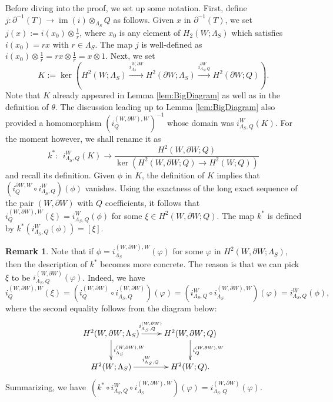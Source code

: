 \documentclass[11pt,a4paper]{amsart}
\theoremstyle{definition}
\newtheorem{remark}[theorem]{Remark}
\newcommand{\im}{\operatorname{im}}
\begin{document}
Before diving into the proof, we set up some notation. First, define $j \colon \partial^{-1}(T) \to \im(i)\otimes_{\Lambda_S} Q$ as follows. 
Given $x$ in $\partial^{-1}(T)$, we set $j(x):=i(x_0) \otimes \frac{1}{r}$, where $x_0$ is any element of $H_2(W;\Lambda_S)$ which satisfies $i(x_0)=r x$ with $r \in \Lambda_S$. 
The map $j$ is well-defined as $i(x_0) \otimes \frac{1}{r}=rx \otimes \frac{1}{r}=x \otimes 1$.
Next, we set 
$$K:=\ker (H^2(W;\Lambda_S) \stackrel{i^{W,\partial W}_{\Lambda_S}}{\longrightarrow} H^2(\partial W;\Lambda_S) \stackrel{i^{\partial W}_{\Lambda_S,Q}}{\longrightarrow} H^2(\partial W;Q)).$$ 
Note that $K$ already appeared in Lemma \ref{lem:BigDiagram} as well as in the definition of $\theta$. The discussion leading up to Lemma \ref{lem:BigDiagram} also provided a homomorphism $(i_Q^{(W,\partial W),W})^{-1}$ whose domain was $i^W_{\Lambda_S,Q}(K)$. 
For the moment however, we shall rename it as 
$$k^* \colon \ \ i^W_{\Lambda_S,Q}(K) \to \frac{H^2(W,\partial W;Q)}{\ker(H^2(W,\partial W ;Q) \to H^2(W;Q))} $$
and recall its definition. Given $\phi$ in $K$, the definition of $K$ implies that $(i_Q^{\partial W, W} \circ i^W_{\Lambda_S,Q})(\phi)$ vanishes. Using the exactness of the long exact sequence of the pair $(W,\partial W)$ with $Q$ coefficients, it follows that $i_{Q}^{(W,\partial W),W}(\xi)=i^W_{\Lambda_S,Q}(\phi)$ for some $\xi \in H^2(W,\partial W;Q)$. The map $k^*$ is defined by $k^* (i^W_{\Lambda_S,Q} (\phi))=[\xi]$.

\begin{remark}
\label{rem:ExampleOfMapk}
Note that if $\phi= i_{\Lambda_S}^{(W,\partial W),W}( \varphi)$ for some $\varphi$ in $H^2(W,\partial W;\Lambda_S)$, then the description of $k^*$ becomes more concrete. The reason is that we can pick $\xi$ to be $ i_{\Lambda_S,Q}^{(W,\partial W)}(\varphi)$. Indeed, we have 
$$i_{Q}^{(W,\partial W),W}(\xi)
=(i_{Q}^{(W,\partial W)} \circ i_{\Lambda_S,Q}^{(W,\partial W)})(\varphi)
= ( i^W_{\Lambda_S,Q} \circ i_{\Lambda_S}^{(W,\partial W),W})( \varphi) 
=i^W_{\Lambda_S,Q}(\phi),$$
where the second equality follows from the diagram below:
\begin{equation}
\label{eq:ExampleOfMapk}
\xymatrix{
H^2(W,\partial W;\Lambda_S) \ar[r]^{i_{\Lambda_S,Q}^{(W,\partial W)}} \ar[d]^{i_{\Lambda_S}^{(W,\partial W),W}}
& H^2(W,\partial W;Q) \ar[d]^{i_Q^{(W,\partial W),W}}\\
H^2(W;\Lambda_S) \ar[r]^{i_{\Lambda_S,Q}^{W}} 
 & H^2(W;Q).
}
\end{equation}
Summarizing, we have~$(k^* \circ i^W_{\Lambda_S,Q} \circ i_{\Lambda_S}^{(W,\partial W),W})(\varphi)= i_{\Lambda_S,Q}^{(W,\partial W)}(\varphi)$. 
\end{remark}
\end{document}
